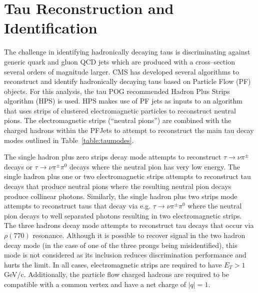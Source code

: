 \section{Tau Reconstruction and Identification}

The challenge in identifying hadronically decaying taus is discriminating against generic quark and gluon QCD jets 
which are produced with a cross--section several orders of magnitude larger. CMS has developed several algorithms to 
reconstruct and identify
hadronically decaying taus based on Particle Flow (PF) objects. For this analysis, the tau POG 
recommended Hadron Plus Strips algorithm (HPS) is used. HPS makes use of PF jets as 
inputs to an algorithm that uses strips of clustered electromagnetic particles to reconstruct neutral pions. The 
electromagnetic strips (``neutral pions'') are combined with the charged hadrons within the PFJets to attempt to 
reconstruct the main tau decay modes outlined in Table~\ref{table:taumodes}.

\begin{table}[ht]
  \caption{Reconstructed Tau Decay Modes}
  \label{table:taumodes} %
\end{table}

The single hadron plus zero strips decay mode attempts to reconstruct $\tau \to \nu\pi^{\pm}$ decays or $\tau \to 
\nu\pi^{\pm}\pi^{0}$ decays where the neutral pion has very low energy. The single hadron plus one or two 
electromagnetic strips attempts to reconstruct tau decays that produce neutral pions where the resulting neutral pion 
decays produce collinear photons. Similarly, the single hadron plus two strips mode attempts to reconstruct taus that 
decay via e.g. $\tau \to \nu\pi^{\pm}\pi^{0}$ where the neutral pion decays to well separated photons resulting in two 
electromagnetic strips. The three hadrons decay mode attempts to reconstruct tau decays that occur via 
$\rho(770)$ resonance. Although it is possible to recover signal in the two hadron decay mode (in the case of one of the
three prongs being misidentified), this mode is not considered as its inclusion reduces discrimination performance and 
hurts the limit. 
In all cases, electromagnetic strips are 
required to have $E_{T} > 1$ GeV/c. Additionally,
the particle flow charged hadrons are required to be compatible with a common 
vertex and have a net charge of $|q|=1$.

